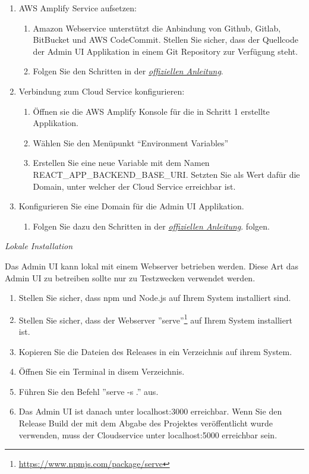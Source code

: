 \begin{enumerate}
    \item AWS Amplify Service aufsetzen:
    \begin{enumerate}
        \item Amazon Webservice unterstützt die Anbindung von Github, Gitlab, BitBucket und AWS CodeCommit. Stellen Sie sicher, dass der Quellcode der Admin UI Applikation in einem Git Repository zur Verfügung steht.
        \item Folgen Sie den Schritten in der \href{https://docs.aws.amazon.com/amplify/latest/userguide/getting-started.html}{\textit{offiziellen Anleitung}}.\cite{aws-amplify}
    \end{enumerate}
    \item Verbindung zum Cloud Service konfigurieren:
    \begin{enumerate}
        \item Öffnen sie die AWS Amplify Konsole für die in Schritt 1 erstellte Applikation.
        \item Wählen Sie den Menüpunkt ``Environment Variables''
        \item Erstellen Sie eine neue Variable mit dem Namen REACT\_APP\_BACKEND\_BASE\_URI. Setzten Sie als Wert dafür die Domain, unter welcher der Cloud Service erreichbar ist.
    \end{enumerate}
    \item Konfigurieren Sie eine Domain für die Admin UI Applikation.
    \begin{enumerate}
        \item Folgen Sie dazu den Schritten in der \href{https://docs.aws.amazon.com/amplify/latest/userguide/custom-domains.html}{\textit{offiziellen Anleitung}}.\cite{aws-amplify-domain} folgen.
    \end{enumerate}
\end{enumerate}

\textit{Lokale Installation}

Das Admin UI kann lokal mit einem Webserver betrieben werden.
Diese Art das Admin UI zu betreiben sollte nur zu Testzwecken verwendet werden.

\begin{enumerate}
    \item Stellen Sie sicher, dass npm und Node.js auf Ihrem System installiert sind.
    \item Stellen Sie sicher, dass der Webserver ''serve''\footnote{\href{https://www.npmjs.com/package/serve}{https://www.npmjs.com/package/serve}} auf Ihrem System installiert ist.
    \item Kopieren Sie die Dateien des Releases in ein Verzeichnis auf ihrem System.
    \item Öffnen Sie ein Terminal in disem Verzeichnis.
    \item Führen Sie den Befehl ''serve -s .'' aus.
    \item Das Admin UI ist danach unter localhost:3000 erreichbar.
    Wenn Sie den Release Build der mit dem Abgabe des Projektes veröffentlicht wurde verwenden, muss der Cloudservice unter localhost:5000 erreichbar sein.
\end{enumerate}


